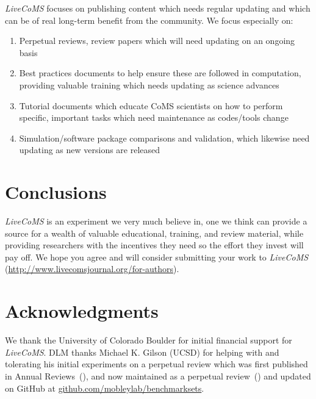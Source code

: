 \documentclass[9pt]{livecoms}
\begin{document}
\emph{LiveCoMS} focuses on publishing content which needs regular updating and which can be of real long-term benefit from the community.
We focus especially on:
\begin{enumerate}
\item Perpetual reviews, review papers which will need updating on an ongoing basis
\item Best practices documents to help ensure these are followed in computation, providing valuable training which needs updating as science advances
\item Tutorial documents which educate CoMS scientists on how to perform specific, important tasks which need maintenance as codes/tools change
\item Simulation/software package comparisons and validation, which likewise need updating as new versions are released
\end{enumerate}

\section{Conclusions}

\emph{LiveCoMS} is an experiment we very much believe in, one we think can provide a source for a wealth of valuable educational, training, and review material, while providing researchers with the incentives they need so the effort they invest will pay off.
We hope you agree and will consider submitting your work to \emph{LiveCoMS} (\url{http://www.livecomsjournal.org/for-authors}).


\section{Acknowledgments}

We thank the University of Colorado Boulder for initial financial support for \emph{LiveCoMS}. 
DLM thanks Michael K. Gilson (UCSD) for helping with and tolerating his initial experiments on a perpetual review which was first published in Annual Reviews~(\cite{Mobley:2017:AnnualReviewofBiophysics}), and now maintained as a perpetual review~(\cite{Mobley:2017:eScholarshipa}) and updated on GitHub at \url{github.com/mobleylab/benchmarksets}.


\end{document}
